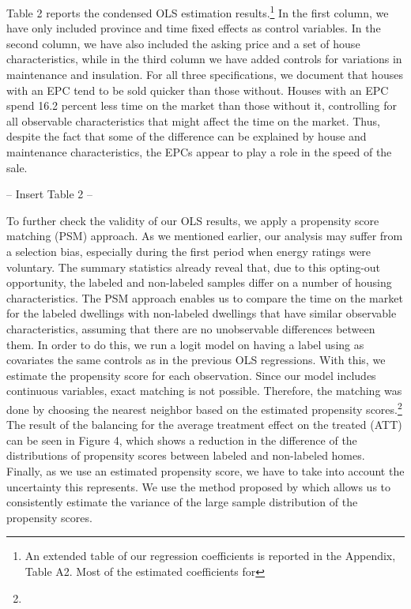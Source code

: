\documentclass[12pt]{article}
\begin{document}
Table 2 reports the condensed OLS estimation results.\footnote{An extended table of our regression coefficients is reported in the Appendix, Table A2. Most of the estimated coefficients for } In the first column, we have only included province and time fixed effects as control variables. In the second column, we have also included the asking price and a set of house characteristics, while in the third column we have added controls for variations in maintenance and insulation. For all three specifications, we document that houses with an EPC tend to be sold quicker than those without. Houses with an EPC spend 16.2 percent less time on the market than those without it, controlling for all observable characteristics that might affect the time on the market. Thus, despite the fact that some of the difference can be explained by house and maintenance characteristics, the EPCs appear to play a role in the speed of the sale.

\begin{center}
-- Insert Table 2 --
\end{center}

To further check the validity of our OLS results, we apply a propensity score matching (PSM) approach. As we mentioned earlier, our analysis may suffer from a selection bias, especially during the first period when energy ratings were voluntary. The summary statistics already reveal that, due to this opting-out opportunity, the labeled and non-labeled samples differ on a number of housing characteristics. The PSM approach enables us to compare the time on the market for the labeled dwellings with non-labeled dwellings that have similar observable characteristics, assuming that there are no unobservable differences between them. In order to do this, we run a logit model on having a label using as covariates the same controls as in the previous OLS regressions. With this, we estimate the propensity score for each observation. Since our model includes continuous variables, exact matching is not possible. Therefore, the matching was done by choosing the nearest neighbor based on the estimated propensity scores.\footnote{} The result of the balancing for the average treatment effect on the treated (ATT) can be seen in Figure 4, which shows a reduction in the difference of the distributions of propensity scores between labeled and non-labeled homes. Finally, as we use an estimated propensity score, we have to take into account the uncertainty this represents. We use the method proposed by \cite{abadie2016matching} which allows us to consistently estimate the variance of the large sample distribution of the propensity scores.
\end{document}
